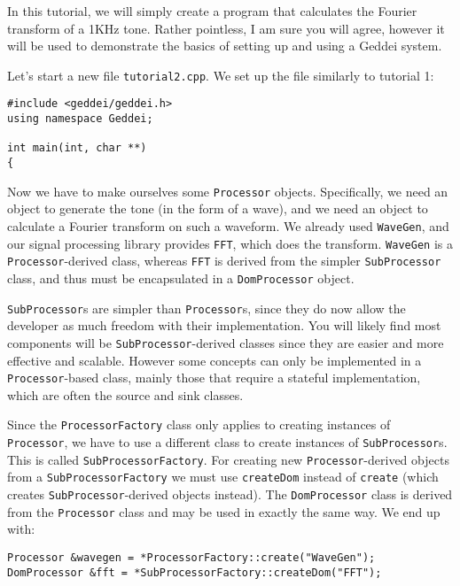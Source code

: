 In this tutorial, we will simply create a program that calculates the Fourier transform of a 1KHz tone. Rather pointless, I am sure you will agree, however it will be used to demonstrate the basics of setting up and using a Geddei system.

Let's start a new file \texttt{tutorial2.cpp}. We set up the file similarly to tutorial 1:

\begin{verbatim}
#include <geddei/geddei.h>
using namespace Geddei;

int main(int, char **)
{
\end{verbatim}

Now we have to make ourselves some \texttt{Processor} objects. Specifically, we need an object to generate the tone (in the form of a wave), and we need an object to calculate a Fourier transform on such a waveform. We already used \texttt{WaveGen}, and our signal processing library provides \texttt{FFT}, which does the transform. \texttt{WaveGen} is a \texttt{Processor}-derived class, whereas \texttt{FFT} is derived from the simpler \texttt{SubProcessor} class, and thus must be encapsulated in a \texttt{DomProcessor} object.

\texttt{SubProcessor}s are simpler than \texttt{Processor}s, since they do now allow the developer as much freedom with their implementation. You will likely find most components will be \texttt{SubProcessor}-derived classes since they are easier and more effective and scalable. However some concepts can only be implemented in a \texttt{Processor}-based class, mainly those that require a stateful implementation, which are often the source and sink classes.

Since the \texttt{ProcessorFactory} class only applies to creating instances of \texttt{Processor}, we have to use a different class to create instances of \texttt{SubProcessor}s. This is called \texttt{SubProcessorFactory}. For creating new \texttt{Processor}-derived objects from a \texttt{SubProcessorFactory} we must use \texttt{createDom} instead of \texttt{create} (which creates \texttt{SubProcessor}-derived objects instead). The \texttt{DomProcessor} class is derived from the \texttt{Processor} class and may be used in exactly the same way. We end up with:

\begin{verbatim}
Processor &wavegen = *ProcessorFactory::create("WaveGen");
DomProcessor &fft = *SubProcessorFactory::createDom("FFT");
\end{verbatim}

